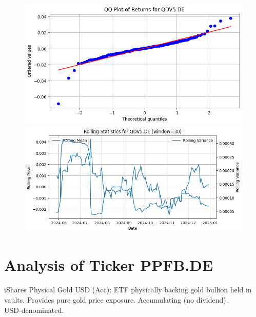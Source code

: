 \documentclass{article}%
\begin{document}
%


\begin{figure}[htbp]%
\begin{minipage}{0.31\textwidth}%
\includegraphics[width=\linewidth]{ticker_images/QDV5.DE_qq_plot.png}%
\end{minipage}%
\begin{minipage}{0.31\textwidth}%
\includegraphics[width=\linewidth]{ticker_images/QDV5.DE_rolling_stats.png}%
\end{minipage}%
\end{figure}

%
\section*{Analysis of Ticker PPFB.DE}%
\label{sec:AnalysisofTickerPPFB.DE}%
iShares Physical Gold USD (Acc): ETF physically backing gold bullion held in vaults. Provides pure gold price exposure. Accumulating (no dividend). USD‑denominated.%
\end{document}

